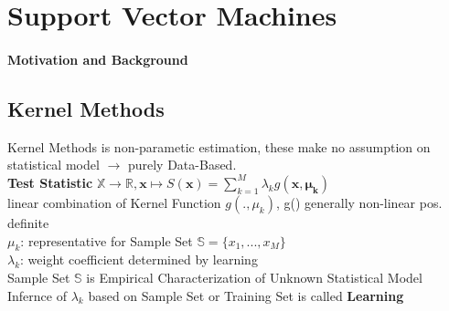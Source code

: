 \section{Support Vector Machines}

	\paragraph{Motivation and Background}
\begin{sectionbox}

	\subsection{Kernel Methods} 
	Kernel Methods is non-parametic estimation, these make no assumption on statistical model $\rightarrow$ purely Data-Based. \\
	\textbf{Test Statistic} 
	$\boxed{\mathbb{X} \rightarrow \mathbb{R}, \mathbf{x}\mapsto S(\mathbf{x})= \sum_{k=1}^{M} \lambda_kg(\mathbf{x}, \mathbf{\mu_k})}$ \\
	linear combination of Kernel Function $g(.,\mu_k)$, g() generally non-linear pos. definite \\ %
	
	$\mu_k$: representative for Sample Set $\mathbb{S}=\{x_1,...,x_M\}$ \\  
	$\lambda_k$: weight coefficient determined by learning \\
	Sample Set $\mathbb{S}$ is Empirical Characterization of Unknown Statistical Model \\
	Infernce of $\lambda_k$ based on Sample Set or Training Set is called \textbf{Learning}

	
\end{sectionbox}

